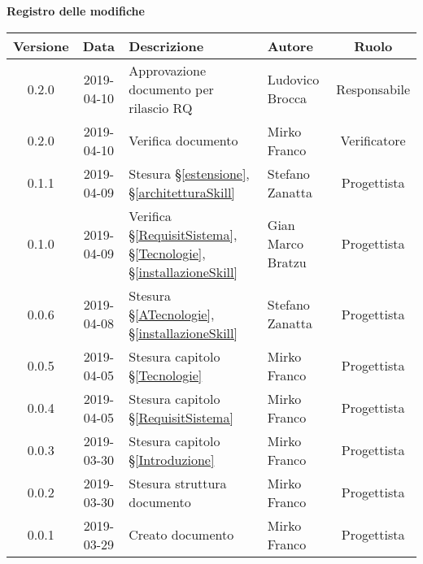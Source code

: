 	\begin{center}
		\textbf{Registro delle modifiche}
	\end{center}
	\begin{center}
		\begin{tabularx}{\textwidth}{|c|c|X|X|c|}
			\hline
			\textbf{Versione} & \textbf{Data} & \textbf{Descrizione} & \textbf{Autore} & \textbf{Ruolo} \\
			\hline
			0.2.0 & 2019-04-10 & Approvazione documento per rilascio RQ & Ludovico Brocca & Responsabile \\		
			\hline
			0.2.0 & 2019-04-10 & Verifica documento & Mirko Franco & Verificatore \\		
			\hline
			0.1.1 & 2019-04-09 & Stesura \S\ref{estensione}, \S\ref{architetturaSkill} & Stefano Zanatta & Progettista \\
			\hline
			0.1.0 & 2019-04-09 & Verifica \S\ref{RequisitSistema}, \S\ref{Tecnologie}, \S\ref{installazioneSkill} & Gian Marco Bratzu & Progettista \\
			\hline
			0.0.6 & 2019-04-08 & Stesura \S\ref{ATecnologie}, \S\ref{installazioneSkill} & Stefano Zanatta & Progettista \\
			\hline
			0.0.5 & 2019-04-05 & Stesura capitolo \S\ref{Tecnologie} & Mirko Franco & Progettista \\
			\hline
			0.0.4 & 2019-04-05 & Stesura capitolo \S\ref{RequisitSistema} & Mirko Franco & Progettista \\
			\hline
			0.0.3 & 2019-03-30 & Stesura capitolo \S\ref{Introduzione} & Mirko Franco & Progettista \\
			\hline
			0.0.2 & 2019-03-30 & Stesura struttura documento & Mirko Franco & Progettista \\
			\hline
			0.0.1 & 2019-03-29 & Creato documento & Mirko Franco & Progettista \\
			\hline
		\end{tabularx}
	\end{center}
\newpage